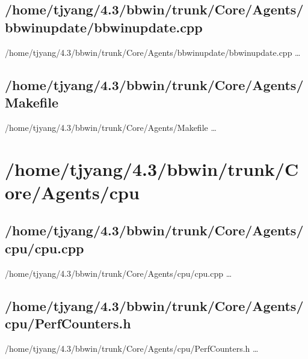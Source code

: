 \subsection{/home/tjyang/4.3/bbwin/trunk/Core/Agents/bbwinupdate/bbwinupdate.cpp}
\lstset{numberstyle=\tiny,numbers=left,
   breaklines=true,
   stepnumber=1,numbersep=5pt,firstnumber=1,
   xleftmargin=12pt,showstringspaces=false}
\noindent /home/tjyang/4.3/bbwin/trunk/Core/Agents/bbwinupdate/bbwinupdate.cpp  \ldots



\subsection{/home/tjyang/4.3/bbwin/trunk/Core/Agents/Makefile}
\lstset{numberstyle=\tiny,numbers=left,
   breaklines=true,
   stepnumber=1,numbersep=5pt,firstnumber=1,
   xleftmargin=12pt,showstringspaces=false}
\noindent /home/tjyang/4.3/bbwin/trunk/Core/Agents/Makefile  \ldots



\section{/home/tjyang/4.3/bbwin/trunk/Core/Agents/cpu}

\subsection{/home/tjyang/4.3/bbwin/trunk/Core/Agents/cpu/cpu.cpp}
\lstset{numberstyle=\tiny,numbers=left,
   breaklines=true,
   stepnumber=1,numbersep=5pt,firstnumber=1,
   xleftmargin=12pt,showstringspaces=false}
\noindent /home/tjyang/4.3/bbwin/trunk/Core/Agents/cpu/cpu.cpp  \ldots



\subsection{/home/tjyang/4.3/bbwin/trunk/Core/Agents/cpu/PerfCounters.h}
\lstset{numberstyle=\tiny,numbers=left,
   breaklines=true,
   stepnumber=1,numbersep=5pt,firstnumber=1,
   xleftmargin=12pt,showstringspaces=false}
\noindent /home/tjyang/4.3/bbwin/trunk/Core/Agents/cpu/PerfCounters.h  \ldots



